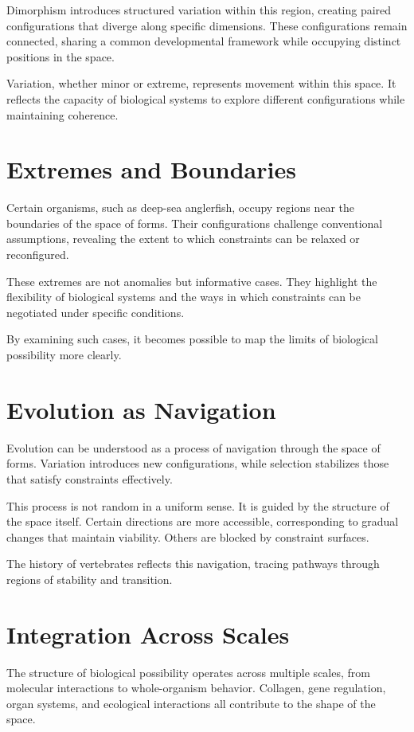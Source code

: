 \documentclass[11pt,oneside]{book}
\begin{document}
Dimorphism introduces structured variation within this region, creating paired configurations that diverge along specific dimensions. These configurations remain connected, sharing a common developmental framework while occupying distinct positions in the space.

Variation, whether minor or extreme, represents movement within this space. It reflects the capacity of biological systems to explore different configurations while maintaining coherence.

\section{Extremes and Boundaries}

Certain organisms, such as deep-sea anglerfish, occupy regions near the boundaries of the space of forms. Their configurations challenge conventional assumptions, revealing the extent to which constraints can be relaxed or reconfigured.

These extremes are not anomalies but informative cases. They highlight the flexibility of biological systems and the ways in which constraints can be negotiated under specific conditions.

By examining such cases, it becomes possible to map the limits of biological possibility more clearly.

\section{Evolution as Navigation}

Evolution can be understood as a process of navigation through the space of forms. Variation introduces new configurations, while selection stabilizes those that satisfy constraints effectively.

This process is not random in a uniform sense. It is guided by the structure of the space itself. Certain directions are more accessible, corresponding to gradual changes that maintain viability. Others are blocked by constraint surfaces.

The history of vertebrates reflects this navigation, tracing pathways through regions of stability and transition.

\section{Integration Across Scales}

The structure of biological possibility operates across multiple scales, from molecular interactions to whole-organism behavior. Collagen, gene regulation, organ systems, and ecological interactions all contribute to the shape of the space.
\end{document}

